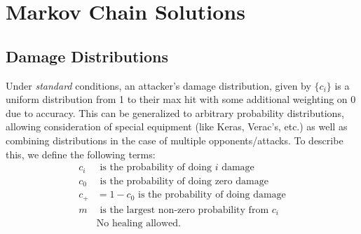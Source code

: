 \chapter{Markov Chain Solutions}
	\section{Damage Distributions}
		Under \textit{standard} conditions, an attacker's damage distribution, given by $\{c_i\}$ is a uniform distribution from 1 to their max hit with some additional weighting on 0 due to accuracy. This can be generalized to arbitrary probability distributions, allowing consideration of special equipment (like Keras, Verac's, etc.) as well as combining distributions in the case of multiple opponents/attacks. To describe this, we define the following terms:
		\begin{align}
		c_i & \text{ is the probability of doing $i$ damage} \\
		c_0 & \text{ is the probability of doing zero damage} \\
		c_+ &= 1 - c_0 \text{ is the probability of doing damage} \\
		m & \text{ is the largest non-zero probability from $c_i$} \\
		&\text{No healing allowed.}
		\end{align}


